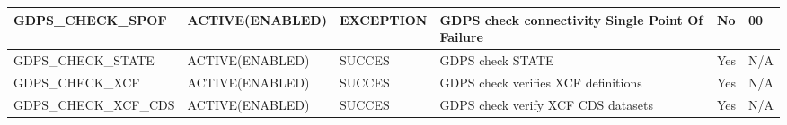 \begin{landscape}
	\begin{table}[h]
		\begin{tabular}{|l|l|l|p{4.5cm}|l|l|}
			\hline
			GDPS\_CHECK\_SPOF         & ACTIVE(ENABLED)  & EXCEPTION        & GDPS check connectivity Single Point Of Failure & No           & 00                 \\ \hline
			GDPS\_CHECK\_STATE        & ACTIVE(ENABLED)  & SUCCES           & GDPS   check STATE                              & Yes          & N/A                \\ \hline
			GDPS\_CHECK\_XCF          & ACTIVE(ENABLED)  & SUCCES           & GDPS   check verifies XCF definitions           & Yes          & N/A                \\ \hline
			GDPS\_CHECK\_XCF\_CDS     & ACTIVE(ENABLED)  & SUCCES           & GDPS   check verify XCF CDS datasets            & Yes          & N/A                \\ \hline
		\end{tabular}
	\end{table}
\end{landscape}


\begin{landscape}
	\begin{table}[h]
		\begin{tabular}{|l|l|l|p{4.5cm}|l|l|}
			
		\end{tabular}
	\end{table}
\end{landscape}